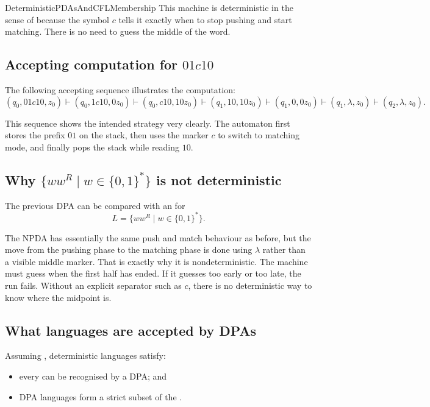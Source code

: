 \documentclass[hidelinks]{article}
\begin{document}
\begin{smodule}[title={Deterministic PDAs and CFL Membership}]{DeterministicPDAsAndCFLMembership}
This machine is deterministic in the sense of  because the symbol $c$ tells it exactly when to stop pushing and start matching.
There is no need to guess the middle of the word.

\subsection{Accepting computation for $01c10$}

The following accepting sequence illustrates the computation:
\[
(q_0,01c10,z_0)
\vdash (q_0,1c10,0z_0)
\vdash (q_0,c10,10z_0)
\vdash (q_1,10,10z_0)
\vdash (q_1,0,0z_0)
\vdash (q_1,\lambda,z_0)
\vdash (q_2,\lambda,z_0).
\]

This sequence shows the intended strategy very clearly.
The automaton first stores the prefix $01$ on the stack, then uses the marker $c$ to switch to matching mode, and finally pops the stack while reading $10$.

\subsection{Why $\{ww^R \mid w \in \{0,1\}^*\}$ is not deterministic}

The previous DPA can be compared with an  for
\[
L = \{ww^R \mid w \in \{0,1\}^*\}.
\]

The NPDA has essentially the same push and match behaviour as before, but the move from the pushing phase to the matching phase is done using $\lambda$ rather than a visible middle marker.
That is exactly why it is nondeterministic.
The machine must guess when the first half has ended.
If it guesses too early or too late, the run fails.
Without an explicit separator such as $c$, there is no deterministic way to know where the midpoint is.

\subsection{What languages are accepted by DPAs}

Assuming , deterministic languages satisfy:
\begin{itemize}
    \item every  can be recognised by a DPA; and
    \item DPA languages form a strict subset of the .
\end{itemize}


\end{smodule}
\end{document}
